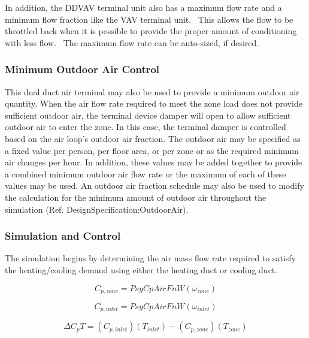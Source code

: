In addition, the DDVAV terminal unit also has a maximum flow rate and a minimum flow fraction like the VAV terminal unit.~ This allows the flow to be throttled back when it is possible to provide the proper amount of conditioning with less flow.~ The maximum flow rate can be auto-sized, if desired.

\subsubsection{Minimum Outdoor Air Control}\label{minimum-outdoor-air-control-1}

This dual duct air terminal may also be used to provide a minimum outdoor air quantity. When the air flow rate required to meet the zone load does not provide sufficient outdoor air, the terminal device damper will open to allow sufficient outdoor air to enter the zone. In this case, the terminal damper is controlled based on the air loop's outdoor air fraction. The outdoor air may be specified as a fixed value per person, per floor area, or per zone or as the required minimum air changes per hour. In addition, these values may be added together to provide a combined minimum outdoor air flow rate or the maximum of each of these values may be used. An outdoor air fraction schedule may also be used to modify the calculation for the minimum amount of outdoor air throughout the simulation (Ref. DesignSpecification:OutdoorAir).

\subsubsection{Simulation and Control}\label{simulation-and-control-6}

The simulation begins by determining the air mass flow rate required to satisfy the heating/cooling demand using either the heating duct or cooling duct.

\begin{equation}
C_{p,zone} = PsyCpAirFnW\left( {\omega_{zone}} \right)
\end{equation}

\begin{equation}
C_{p,inlet} = PsyCpAirFnW\left( {\omega_{inlet}} \right)
\end{equation}

\begin{equation}
\Delta C_p T = \left( {C_{p,inlet}} \right)\left( {{T_{inlet}}} \right) - \left( {C_{p,zone}} \right)\left( {{T_{zone}}} \right)
\end{equation}

